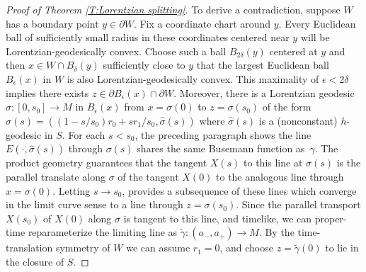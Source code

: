 \documentclass[12pt]{amsart}
\newcommand{\p}{{\partial}}
\begin{document}
\begin{proof}[Proof of Theorem \ref{T:Lorentzian splitting}]
To derive a contradiction, suppose $W$ has a boundary point $y \in \p W$.
Fix a coordinate chart around $y$. Every Euclidean
ball of sufficiently small radius in these coordinates centered near $y$ will be Lorentzian-geodesically convex.  Choose such a ball $B_{2\delta}(y)$ centered at $y$ and then 
$x \in W\cap B_\delta(y)$ sufficiently close to $y$
that the largest Euclidean ball $B_\epsilon(x)$ in $W$ is also Lorentzian-geodesically convex.  This maximality of $\epsilon < 2\delta$ implies there exists $z \in \p B_\epsilon(x) \cap \p W$.  Moreover,  there is a Lorentzian geodesic
$\sigma:[0,s_0] \longrightarrow M$ in $B_\epsilon(x)$
from $x=\sigma(0)$ to $z=\sigma(s_0)$
of the form $\sigma(s) = ((1-s/s_0)r_0 + sr_1/s_0,\hat \sigma(s))$
where $\hat \sigma(s)$ is a (nonconstant) $h$-geodesic in $S$.
For each $s<s_0$,  the preceding paragraph shows
the line $E(\cdot,\hat \sigma(s))$ through $\sigma(s)$ 
shares the same Busemann function
as~$\gamma$.  The product geometry guarantees
that the tangent $X(s)$ to this line at $\sigma(s)$ is the parallel translate along $\sigma$ of the tangent $X(0)$
to the analogous line through $x=\sigma(0)$.
Letting $s\to s_0$,  \cite[Lemma~2.4]{GallowayHorta96} provides
a subsequence of these lines which converge in the limit curve sense to a line through $z=\sigma(s_0)$.
Since the parallel transport $X(s_0)$ of $X(0)$
along $\sigma$ is tangent to this line, and timelike,
we can proper-time reparameterize the limiting line
as $\tilde \gamma:(a_-,a_+)\longrightarrow M$.  By the time-translation symmetry of $W$
we can assume $r_1=0$, and choose $z=\tilde \gamma(0)$ to lie in the closure 
of $S$.
 

\end{proof}
\end{document}
